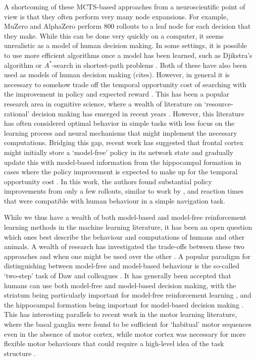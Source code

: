 A shortcoming of these MCTS-based approaches from a neuroscientific point of view is that they often perform very many node expansions.
For example, MuZero and AlphaZero perform 800 rollouts to a leaf node for each decision that they make.
While this can be done very quickly on a computer, it seems unrealistic as a model of human decision making.
In some settings, it is possible to use more efficient algorithms once a model has been learned, such as Djikstra's algorithm or $A^*$-search in shortest-path problems \citep{hart1968formal}.
Both of these have also been used as models of human decision making (cites).
However, in general it is necessary to somehow trade off the temporal opportunity cost of searching with the improvement in policy and expected reward \citep{botvinick2014computational}.
This has been a popular research area in cognitive science, where a wealth of literature on `resource-rational' decision making has emerged in recent years \citep{griffiths2019doing,callaway2022rational}.
However, this literature has often considered optimal behavior in simple tasks with less focus on the learning process and neural mechanisms that might implement the necessary computations.
Bridging this gap, recent work has suggested that frontal cortex might initially store a `model-free' policy in its network state and gradually update this with model-based information from the hippocampal formation in cases where the policy improvement is expected to make up for the temporal opportunity cost \citep{jensen2023recurrent}.
In this work, the authors found substantial policy improvements from only a few rollouts, similar to work by \citep{vul2014one}, and reaction times that were compatible with human behaviour in a simple navigation task.

While we thus have a wealth of both model-based and model-free reinforcement learning methods in the machine learning literature, it has been an open question which ones best describe the behaviour and computations of humans and other animals.
A wealth of research has investigated the trade-offs between these two approaches and when one might be used over the other \citep{daw2005uncertainty, geerts2020general}.
A popular paradigm for distinguishing between model-free and model-based behaviour is the so-called `two-step' task of Daw and colleagues \citep{daw2011model}.
It has generally been accepted that humans can use both model-free and model-based decision making, with the striatum being particularly important for model-free reinforcement learning \citep{yin2004lesions, yin2005role}, and the hippocampal formation being important for model-based decision making \citep{vikbladh2019hippocampal,geerts2020general,miller2017dorsal}.
This has interesting parallels to recent work in the motor learning literature, where the basal ganglia were found to be sufficient for `habitual' motor sequences even in the absence of motor cortex, while motor cortex was necessary for more flexible motor behaviours that could require a high-level idea of the task structure \citep{mizes2023motor}.


